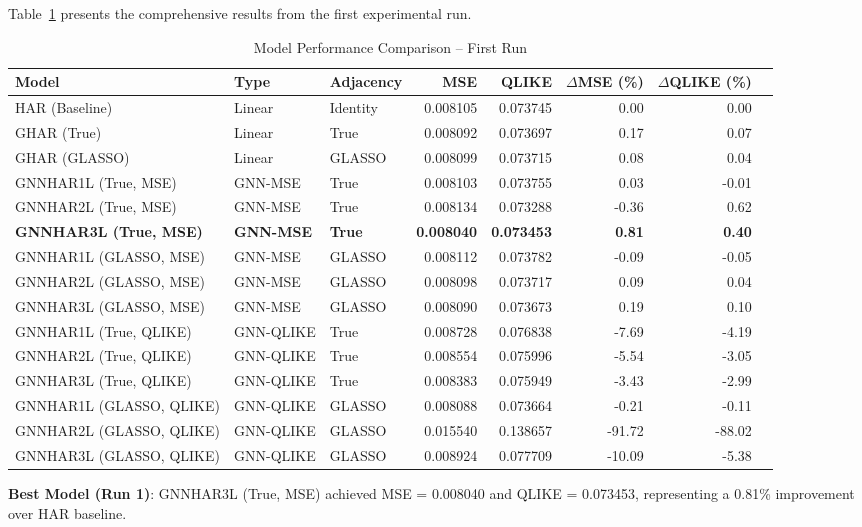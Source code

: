 \documentclass[10pt,a4paper]{article}
\begin{document}
Table~\ref{tab:run1} presents the comprehensive results from the first experimental run.

\begin{table}[H]
\centering
\caption{Model Performance Comparison -- First Run}
\label{tab:run1}
\small
\begin{tabular}{@{}lllrrrrr@{}}
\toprule
Model & Type & Adjacency & MSE & QLIKE & $\Delta$MSE (\%) & $\Delta$QLIKE (\%) \\
\midrule
HAR (Baseline) & Linear & Identity & 0.008105 & 0.073745 & 0.00 & 0.00 \\
GHAR (True) & Linear & True & 0.008092 & 0.073697 & 0.17 & 0.07 \\
GHAR (GLASSO) & Linear & GLASSO & 0.008099 & 0.073715 & 0.08 & 0.04 \\
\midrule
GNNHAR1L (True, MSE) & GNN-MSE & True & 0.008103 & 0.073755 & 0.03 & -0.01 \\
GNNHAR2L (True, MSE) & GNN-MSE & True & 0.008134 & 0.073288 & -0.36 & 0.62 \\
\textbf{GNNHAR3L (True, MSE)} & \textbf{GNN-MSE} & \textbf{True} & \textbf{0.008040} & \textbf{0.073453} & \textbf{0.81} & \textbf{0.40} \\
\midrule
GNNHAR1L (GLASSO, MSE) & GNN-MSE & GLASSO & 0.008112 & 0.073782 & -0.09 & -0.05 \\
GNNHAR2L (GLASSO, MSE) & GNN-MSE & GLASSO & 0.008098 & 0.073717 & 0.09 & 0.04 \\
GNNHAR3L (GLASSO, MSE) & GNN-MSE & GLASSO & 0.008090 & 0.073673 & 0.19 & 0.10 \\
\midrule
GNNHAR1L (True, QLIKE) & GNN-QLIKE & True & 0.008728 & 0.076838 & -7.69 & -4.19 \\
GNNHAR2L (True, QLIKE) & GNN-QLIKE & True & 0.008554 & 0.075996 & -5.54 & -3.05 \\
GNNHAR3L (True, QLIKE) & GNN-QLIKE & True & 0.008383 & 0.075949 & -3.43 & -2.99 \\
\midrule
GNNHAR1L (GLASSO, QLIKE) & GNN-QLIKE & GLASSO & 0.008088 & 0.073664 & -0.21 & -0.11 \\
GNNHAR2L (GLASSO, QLIKE) & GNN-QLIKE & GLASSO & 0.015540 & 0.138657 & -91.72 & -88.02 \\
GNNHAR3L (GLASSO, QLIKE) & GNN-QLIKE & GLASSO & 0.008924 & 0.077709 & -10.09 & -5.38 \\
\bottomrule
\end{tabular}
\end{table}

\textbf{Best Model (Run 1)}: GNNHAR3L (True, MSE) achieved MSE = 0.008040 and QLIKE = 0.073453, representing a 0.81\% improvement over HAR baseline.
\end{document}
